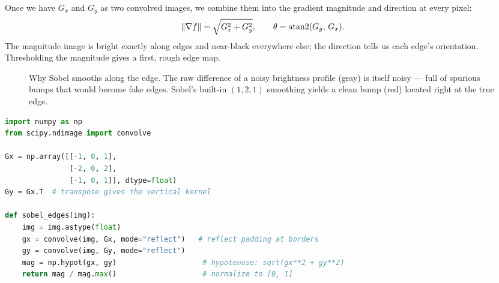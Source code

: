 Once we have $G_x$ and $G_y$ as two convolved images, we combine them into the
gradient magnitude and direction at every pixel:
\begin{equation}
\label{ch32:grad-mag}
\lVert\nabla f\rVert = \sqrt{G_x^2 + G_y^2}, \qquad
\theta = \operatorname{atan2}(G_y,\, G_x).
\end{equation}
The magnitude image is bright exactly along edges and near-black everywhere
else; the direction tells us each edge's orientation. Thresholding the
magnitude gives a first, rough edge map.

\begin{figure}[H]
\centering
{}
\caption{Why Sobel smooths along the edge. The raw difference of a noisy
brightness profile (gray) is itself noisy --- full of spurious bumps that would
become fake edges. Sobel's built-in $(1,2,1)$ smoothing yields a clean bump
(red) located right at the true edge.}
\label{ch32:fig-sobel-smooth}
\end{figure}

\begin{lstlisting}[language=Python,caption={Sobel edge magnitude in NumPy/SciPy.},label={ch32:lst-sobel}]
import numpy as np
from scipy.ndimage import convolve

Gx = np.array([[-1, 0, 1],
               [-2, 0, 2],
               [-1, 0, 1]], dtype=float)
Gy = Gx.T  # transpose gives the vertical kernel

def sobel_edges(img):
    img = img.astype(float)
    gx = convolve(img, Gx, mode="reflect")   # reflect padding at borders
    gy = convolve(img, Gy, mode="reflect")
    mag = np.hypot(gx, gy)                    # hypotenuse: sqrt(gx**2 + gy**2)
    return mag / mag.max()                    # normalize to [0, 1]
\end{lstlisting}

